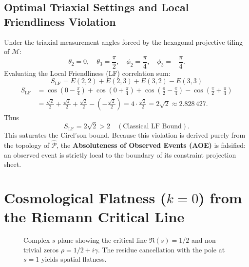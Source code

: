 \documentclass[11pt, a4paper, twocolumn]{article}
\theoremstyle{plain}
\theoremstyle{definition}
\begin{document}
\subsection{Optimal Triaxial Settings and Local Friendliness Violation}
Under the triaxial measurement angles forced by the hexagonal projective tiling of $\mathcal{M}$:
\[
\theta_2 = 0, \quad \theta_3 = \frac{\pi}{2}, \quad \phi_2 = \frac{\pi}{4}, \quad \phi_3 = -\frac{\pi}{4}.
\]
Evaluating the Local Friendliness (LF) correlation sum:
\[
S_{\mathrm{LF}} = E(2, 2) + E(2, 3) + E(3, 2) - E(3, 3)
\]
\[
\begin{aligned}
S_{\mathrm{LF}} &= \cos\left(0 - \frac{\pi}{4}\right) + \cos\left(0 + \frac{\pi}{4}\right) + \cos\left(\frac{\pi}{2} - \frac{\pi}{4}\right) - \cos\left(\frac{\pi}{2} + \frac{\pi}{4}\right) \\
&= \frac{\sqrt{2}}{2} + \frac{\sqrt{2}}{2} + \frac{\sqrt{2}}{2} - \left(-\frac{\sqrt{2}}{2}\right) = 4 \cdot \frac{\sqrt{2}}{2} = 2\sqrt{2} \approx 2.828\,427.
\end{aligned}
\]
Thus
\[
\boxed{S_{\mathrm{LF}} = 2\sqrt{2} > 2} \quad (\text{Classical LF Bound}).
\]
This saturates the Cirel'son bound. Because this violation is derived purely from the topology of $\hat{\mathcal{P}}$, the \textbf{Absoluteness of Observed Events (AOE)} is falsified: an observed event is strictly local to the boundary of its constraint projection sheet.

\section{Cosmological Flatness ($k=0$) from the Riemann Critical Line}
\label{sec:riemann}

\begin{figure}[h]
\centering
{}
\caption{Complex $s$-plane showing the critical line $\Re(s)=1/2$ and non-trivial zeros $\rho = 1/2 + i\gamma$. The residue cancellation with the pole at $s=1$ yields spatial flatness.}
\label{fig:riemann}
\end{figure}
\end{document}
